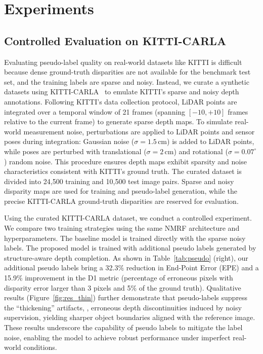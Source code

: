 \section{Experiments}

\subsection{Controlled Evaluation on KITTI-CARLA}

Evaluating pseudo-label quality on real-world datasets like KITTI is difficult because dense ground-truth disparities are not available for the benchmark test set, and the training labels are sparse and noisy.
Instead, we curate a synthetic datasets using KITTI-CARLA~\cite{deschaud2021kitticarla} to emulate KITTI's sparse and noisy depth annotations.
Following KITTI's data collection protocol, LiDAR points are integrated over a temporal window of 21 frames (spanning $[-10, +10]$ frames relative to the current frame) to generate sparse depth maps.
To simulate real-world measurement noise, perturbations are applied to LiDAR points and sensor poses during integration: Gaussian noise ($\sigma=1.5\,\mathrm{cm}$) is added to LiDAR points, while poses are perturbed with translational ($\sigma=2\,\mathrm{cm}$) and rotational ($\sigma=0.07^\circ$) random noise.
This procedure ensures depth maps exhibit sparsity and noise characteristics consistent with KITTI's ground truth.
The curated dataset is divided into 24,500 training and 10,500 test image pairs.
Sparse and noisy disparity maps are used for training and pseudo-label generation, while the precise KITTI-CARLA ground-truth disparities are reserved for evaluation.

Using the curated KITTI-CARLA dataset, we conduct a controlled experiment.
We compare two training strategies using the same NMRF architecture and hyperparameters.
The baseline model is trained directly with the sparse noisy labels.
The proposed model is trained with additional pseudo labels generated by structure-aware depth completion.
As shown in Table~\ref{tab:pseudo} (right), our additional pseudo labels bring a 32.3\% reduction in End-Point Error (EPE) and a 15.9\% improvement in the D1 metric (percentage of erroneous pixels with disparity error larger than 3 pixels and 5\% of the ground truth).
Qualitative results (Figure~\ref{fig:res_thin}) further demonstrate that pseudo-labels suppress the ``thickening'' artifacts, \ie, erroneous depth discontinuities induced by noisy supervision, yielding sharper object boundaries aligned with the reference image.
These results underscore the capability of pseudo labels to mitigate the label noise, enabling the model to achieve robust performance under imperfect real-world conditions.

